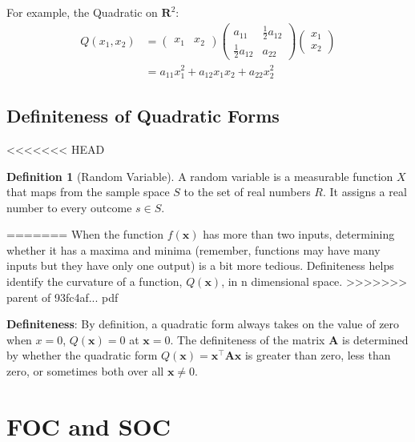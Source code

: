 \documentclass[]{book}
\theoremstyle{definition}
\newtheorem{definition}{Definition}[chapter]
\theoremstyle{definition}
\theoremstyle{definition}
\theoremstyle{remark}
\begin{document}
For example, the Quadratic on \(\mathbf{R}^2\):
\begin{align*}
  Q(x_1,x_2)&=\begin{pmatrix} x_1& x_2 \end{pmatrix} \begin{pmatrix} a_{11}&\frac{1}{2} a_{12}\\
  \frac{1}{2}a_{12}&a_{22}\end{pmatrix} \begin{pmatrix} x_1\\x_2 \end{pmatrix} \\
  &= a_{11}x_1^2 + a_{12}x_1x_2 + a_{22}x_2^2
\end{align*}

\hypertarget{definiteness-of-quadratic-forms}{%
\subsection*{Definiteness of Quadratic Forms}\label{definiteness-of-quadratic-forms}}

<<<<<<< HEAD
\begin{definition}[Random Variable]
\protect\hypertarget{def:unnamed-chunk-71}{}{\label{def:unnamed-chunk-71} {} }
A random variable is a measurable function \(X\) that maps from the sample space \(S\) to the set of real numbers \(R.\) It assigns a real number to every outcome \(s \in S\).
\end{definition}
=======
When the function \(f(\mathbf{x})\) has more than two inputs, determining whether it has a maxima and minima (remember, functions may have many inputs but they have only one output) is a bit more tedious. Definiteness helps identify the curvature of a function, \(Q(\textbf{x})\), in n dimensional space.
>>>>>>> parent of 93fc4af... pdf

\textbf{Definiteness}: By definition, a quadratic form always takes on the value of zero when \(x = 0\), \(Q(\textbf{x})=0\) at \(\textbf{x}=0\). The definiteness of the matrix \(\textbf{A}\) is determined by whether the
quadratic form \(Q(\textbf{x})=\textbf{x}^\top\textbf{A}\textbf{x}\) is greater than zero, less than
zero, or sometimes both over all \(\mathbf{x}\ne 0\).

\hypertarget{foc-and-soc}{%
\section{FOC and SOC}\label{foc-and-soc}}
\end{document}
